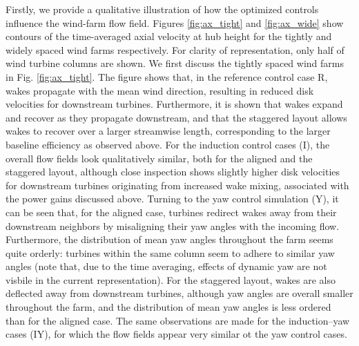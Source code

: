 \documentclass[a4paper]{jpconf}
\begin{document}
Firstly, we provide a qualitative illustration of how the optimized controls influence the wind-farm flow field. Figures \ref{fig:ax_tight} and
\ref{fig:ax_wide} show contours of the time-averaged axial velocity at hub height for the tightly and widely spaced wind farms respectively. For
clarity of representation, only half of wind turbine columns are shown. We first discuss the tightly spaced wind farms in Fig.
\ref{fig:ax_tight}. The figure shows that, in the reference control case R, wakes propagate with the mean wind direction, resulting in reduced disk velocities for downstream turbines. Furthermore, it is shown that wakes expand and
recover as they propagate downstream, and that the staggered layout allows wakes to recover over a larger streamwise length, corresponding to the
larger baseline efficiency as observed above. For the induction control cases (I), the overall flow fields look qualitatively similar, both for the
aligned and the staggered layout, although close inspection shows slightly higher disk velocities for downstream turbines originating from increased wake mixing, associated with the power
gains discussed above. Turning to the yaw control simulation (Y), it can be seen that, for the aligned case, turbines redirect wakes away from their
downstream neighbors by misaligning their yaw angles with the incoming flow. Furthermore, the distribution of mean yaw angles throughout the farm
seems quite orderly: turbines within the same column seem to adhere to similar yaw angles (note that, due to the time averaging, effects of dynamic
yaw are not visbile in the current representation). For the staggered layout, wakes are also deflected away from downstream turbines, although yaw
angles are overall smaller throughout the farm, and the distribution of mean yaw angles is less ordered than for the aligned case. The same
observations are made for the induction--yaw cases (IY), for which the flow fields appear very similar ot the yaw control cases.
\end{document}
